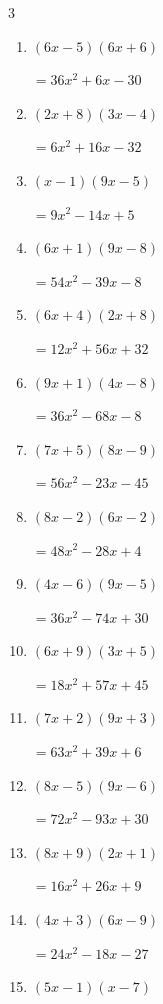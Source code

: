 \begin{multicols}{3}
\begin{enumerate}
        $=5x^{2}+32x-64$

\columnbreak %

  \item $(6x-5)(6x+6)$

        $=36x^{2}+6x-30$

  \item $(2x+8)(3x-4)$

        $=6x^{2}+16x-32$

  \item $(x-1)(9x-5)$

        $=9x^{2}-14x+5$

  \item $(6x+1)(9x-8)$

        $=54x^{2}-39x-8$

  \item $(6x+4)(2x+8)$

        $=12x^{2}+56x+32$

  \item $(9x+1)(4x-8)$

        $=36x^{2}-68x-8$

  \item $(7x+5)(8x-9)$

        $=56x^{2}-23x-45$

  \item $(8x-2)(6x-2)$

        $=48x^{2}-28x+4$

  \item $(4x-6)(9x-5)$

        $=36x^{2}-74x+30$

  \item $(6x+9)(3x+5)$

        $=18x^{2}+57x+45$

  \item $(7x+2)(9x+3)$

        $=63x^{2}+39x+6$

  \item $(8x-5)(9x-6)$

        $=72x^{2}-93x+30$

  \item $(8x+9)(2x+1)$

        $=16x^{2}+26x+9$

  \item $(4x+3)(6x-9)$

        $=24x^{2}-18x-27$

  \item $(5x-1)(x-7)$


\end{enumerate}
\end{multicols}

